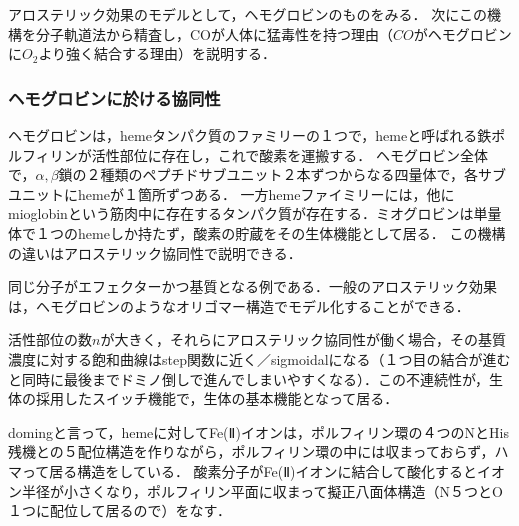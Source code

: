 \documentclass[uplatex, dvipdfmx]{jsreport}
\begin{document}
アロステリック効果のモデルとして，ヘモグロビンのものをみる．
次にこの機構を分子軌道法から精査し，COが人体に猛毒性を持つ理由（$CO$がヘモグロビンに$O_2$より強く結合する理由）を説明する．

\subsubsection{ヘモグロビンに於ける協同性}

\begin{definition}
    ヘモグロビンは，hemeタンパク質のファミリーの１つで，hemeと呼ばれる鉄ポルフィリンが活性部位に存在し，これで酸素を運搬する．
ヘモグロビン全体で，$\alpha,\beta$鎖の２種類のペプチドサブユニット２本ずつからなる四量体で，各サブユニットにhemeが１箇所ずつある．
一方hemeファイミリーには，他にmioglobinという筋肉中に存在するタンパク質が存在する．ミオグロビンは単量体で１つのhemeしか持たず，酸素の貯蔵をその生体機能として居る．
この機構の違いはアロステリック協同性で説明できる．
\end{definition}
\begin{remark}
    同じ分子がエフェクターかつ基質となる例である．一般のアロステリック効果は，ヘモグロビンのようなオリゴマー構造でモデル化することができる．
\end{remark}

\begin{shadebox}
    \begin{fact}
    活性部位の数$n$が大きく，それらにアロステリック協同性が働く場合，その基質濃度に対する飽和曲線はstep関数に近く／sigmoidalになる（１つ目の結合が進むと同時に最後までドミノ倒しで進んでしまいやすくなる）．この不連続性が，生体の採用したスイッチ機能で，生体の基本機能となって居る．
    \end{fact}
\end{shadebox}

\begin{fact}[doming状態]\label{fact-doming-porphyrin}
    domingと言って，hemeに対してFe(Ⅱ)イオンは，ポルフィリン環の４つのNとHis残機との５配位構造を作りながら，ポルフィリン環の中には収まっておらず，ハマって居る構造をしている．
酸素分子がFe(Ⅱ)イオンに結合して酸化するとイオン半径が小さくなり，ポルフィリン平面に収まって擬正八面体構造（N５つとO１つに配位して居るので）をなす．
\end{fact}
\end{document}
